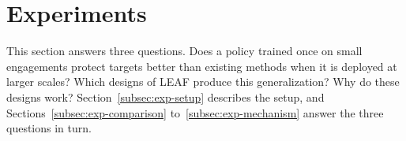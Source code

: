 
\section{Experiments}
\label{sec:experiments}

This section answers three questions. Does a policy trained once on small engagements protect targets better than existing methods when it is deployed at larger scales? Which designs of LEAF produce this generalization? Why do these designs work? Section~\ref{subsec:exp-setup} describes the setup, and Sections~\ref{subsec:exp-comparison} to~\ref{subsec:exp-mechanism} answer the three questions in turn.

